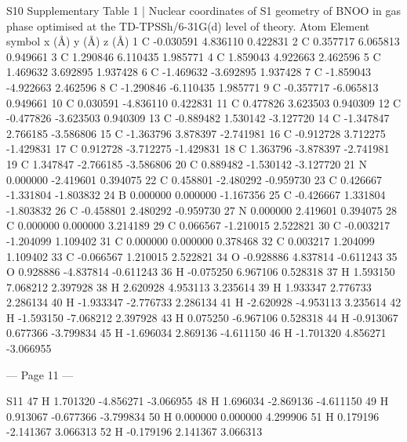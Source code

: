 S10 
Supplementary Table 1 | Nuclear coordinates of S1 geometry of BNOO in gas phase 
optimised at the TD-TPSSh/6-31G(d) level of theory. 
Atom 
Element symbol 
x (Å)        
y (Å)       
z (Å)        
1 
C 
-0.030591  
4.836110  
0.422831  
2 
C 
0.357717  
6.065813  
0.949661  
3 
C 
1.290846  
6.110435  
1.985771  
4 
C 
1.859043  
4.922663  
2.462596  
5 
C 
1.469632  
3.692895  
1.937428  
6 
C 
-1.469632  
-3.692895  
1.937428  
7 
C 
-1.859043  
-4.922663  
2.462596  
8 
C 
-1.290846  
-6.110435  
1.985771  
9 
C 
-0.357717  
-6.065813  
0.949661  
10 
C 
0.030591  
-4.836110  
0.422831  
11 
C 
0.477826  
3.623503  
0.940309  
12 
C 
-0.477826  
-3.623503  
0.940309  
13 
C 
-0.889482  
1.530142  
-3.127720  
14 
C 
-1.347847  
2.766185  
-3.586806  
15 
C 
-1.363796  
3.878397  
-2.741981  
16 
C 
-0.912728  
3.712275  
-1.429831  
17 
C 
0.912728  
-3.712275  
-1.429831  
18 
C 
1.363796  
-3.878397  
-2.741981  
19 
C 
1.347847  
-2.766185  
-3.586806  
20 
C 
0.889482  
-1.530142  
-3.127720  
21 
N 
0.000000  
-2.419601  
0.394075  
22 
C 
0.458801  
-2.480292  
-0.959730  
23 
C 
0.426667  
-1.331804  
-1.803832  
24 
B 
0.000000  
0.000000  
-1.167356  
25 
C 
-0.426667  
1.331804  
-1.803832  
26 
C 
-0.458801  
2.480292  
-0.959730  
27 
N 
0.000000  
2.419601  
0.394075  
28 
C 
0.000000  
0.000000  
3.214189  
29 
C 
0.066567  
-1.210015  
2.522821  
30 
C 
-0.003217  
-1.204099  
1.109402  
31 
C 
0.000000  
0.000000  
0.378468  
32 
C 
0.003217  
1.204099  
1.109402  
33 
C 
-0.066567  
1.210015  
2.522821  
34 
O 
-0.928886  
4.837814  
-0.611243  
35 
O 
0.928886  
-4.837814  
-0.611243  
36 
H 
-0.075250  
6.967106  
0.528318  
37 
H 
1.593150  
7.068212  
2.397928  
38 
H 
2.620928  
4.953113  
3.235614  
39 
H 
1.933347  
2.776733  
2.286134  
40 
H 
-1.933347  
-2.776733  
2.286134  
41 
H 
-2.620928  
-4.953113  
3.235614  
42 
H 
-1.593150  
-7.068212  
2.397928  
43 
H 
0.075250  
-6.967106  
0.528318  
44 
H 
-0.913067  
0.677366  
-3.799834  
45 
H 
-1.696034  
2.869136  
-4.611150  
46 
H 
-1.701320  
4.856271  
-3.066955  


--- Page 11 ---
 
S11 
47 
H 
1.701320  
-4.856271  
-3.066955  
48 
H 
1.696034  
-2.869136  
-4.611150  
49 
H 
0.913067  
-0.677366  
-3.799834  
50 
H 
0.000000  
0.000000  
4.299906  
51 
H 
0.179196  
-2.141367  
3.066313  
52 
H 
-0.179196  
2.141367  
3.066313  
 
